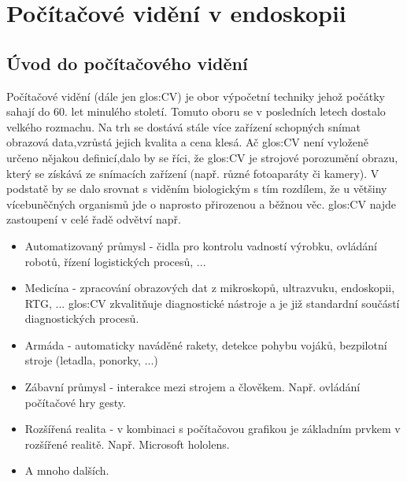 \chapter{Počítačové vidění v endoskopii}
\section{Úvod do počítačového vidění}
Počítačové vidění (dále jen \gls{glos:CV}) je obor výpočetní techniky jehož počátky sahají do 60. let minulého století. Tomuto oboru se v posledních letech dostalo velkého rozmachu. Na trh se dostává stále více zařízení schopných snímat obrazová data,vzrůstá jejich kvalita a cena klesá. Ač \gls{glos:CV} není vyloženě určeno nějakou definicí,dalo by se říci, že \gls{glos:CV} je strojové porozumění obrazu, který se získává ze snímacích zařízení (např. různé fotoaparáty či kamery). V podstatě by se dalo srovnat s viděním biologickým s tím rozdílem, že u většiny vícebuněčných organismů jde o naprosto přirozenou a běžnou věc.\cite{learning}\cite{image} \gls{glos:CV} najde zastoupení v celé řadě odvětví např.

\begin{itemize}
	\item Automatizovaný průmysl - čidla pro kontrolu vadností výrobku, ovládání robotů, řízení logistických procesů, ...
	\item Medicína - zpracování obrazových dat z mikroskopů, ultrazvuku, endoskopii, RTG, ... \gls{glos:CV} zkvalitňuje diagnostické nástroje a je již standardní součástí diagnostických procesů.
	\item Armáda - automaticky naváděné rakety, detekce pohybu vojáků, bezpilotní stroje (letadla, ponorky, ...)
	\item Zábavní průmysl - interakce mezi strojem a člověkem. Např. ovládání počítačové hry gesty.
	\item Rozšířená realita - v kombinaci s počítačovou grafikou je základním prvkem v rozšířené realitě. Např. Microsoft hololens.
	\item A mnoho dalších.
\end{itemize}

